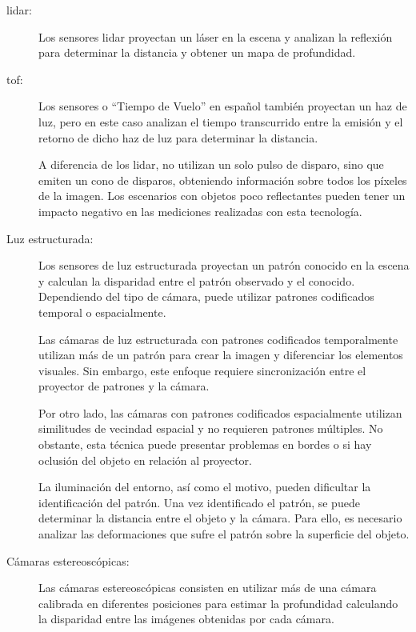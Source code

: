 \begin{description}
    \item[\gls{lidar}:]
    
    Los sensores \gls{lidar} proyectan un láser en la escena y analizan la reflexión para determinar la distancia y obtener un mapa de profundidad.

    \item[\gls{tof}:]
    
    Los sensores \textit{} o ``Tiempo de Vuelo'' en español también proyectan un haz de luz, pero en este caso analizan el tiempo transcurrido entre la emisión y el retorno de dicho haz de luz para determinar la distancia.
    
    A diferencia de los \gls{lidar}, no utilizan un solo pulso de disparo, sino que emiten un cono de disparos, obteniendo información sobre todos los píxeles de la imagen.
    Los escenarios con objetos poco reflectantes pueden tener un impacto negativo en las mediciones realizadas con esta tecnología.
    
    \item[Luz estructurada:]
    
    Los sensores de luz estructurada proyectan un patrón conocido en la escena y calculan la disparidad entre el patrón observado y el conocido.
    Dependiendo del tipo de cámara, puede utilizar patrones codificados temporal o espacialmente.

    Las cámaras de luz estructurada con patrones codificados temporalmente utilizan más de un patrón para crear la imagen y diferenciar los elementos visuales.
    Sin embargo, este enfoque requiere sincronización entre el proyector de patrones y la cámara. 
    
    Por otro lado, las cámaras con patrones codificados espacialmente utilizan similitudes de vecindad espacial y no requieren patrones múltiples.
    No obstante, esta técnica puede presentar problemas en bordes o si hay oclusión del objeto en relación al proyector.

    La iluminación del entorno, así como el motivo, pueden dificultar la identificación del patrón.
    Una vez identificado el patrón, se puede determinar la distancia entre el objeto y la cámara.
    Para ello, es necesario analizar las deformaciones que sufre el patrón sobre la superficie del objeto.

    \item[Cámaras estereoscópicas:]
    
    Las cámaras estereoscópicas consisten en utilizar más de una cámara calibrada en diferentes posiciones para estimar la profundidad calculando la disparidad entre las imágenes obtenidas por cada cámara.


\end{description}

